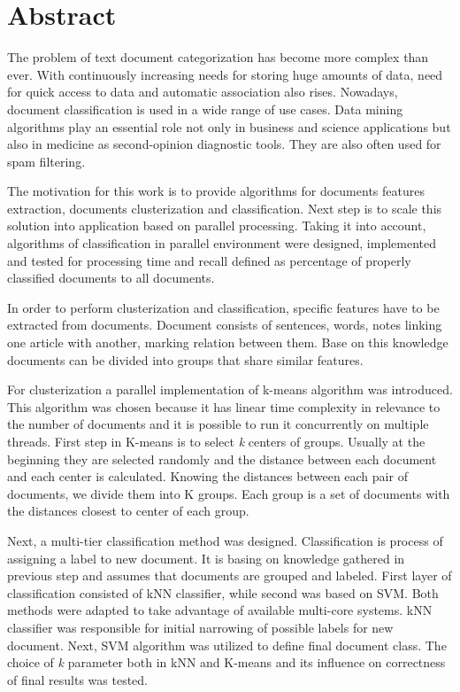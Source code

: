 \chapter*{Abstract}

The problem of text document categorization has become more complex than ever. With continuously increasing needs for storing huge amounts of data, need for quick access to data and automatic association also rises. Nowadays, document classification is used in a wide range of use cases. Data mining algorithms play an essential role not only in business and science applications but also in medicine as second-opinion diagnostic tools. They are also often used for spam filtering. 

The motivation for this work is to provide algorithms for documents features extraction, documents clusterization and classification. Next step is to scale this solution into application based on parallel processing. Taking it into account, algorithms of classification in parallel environment were designed, implemented and tested for processing time and recall defined as percentage of properly classified documents to all documents. 

In order to perform clusterization and classification, specific features have to be extracted from documents. Document consists of sentences, words, notes linking one article with another, marking relation between them. Base on this knowledge documents can be divided into groups that share similar features. 

For clusterization a parallel implementation of k-means algorithm was introduced. This algorithm was chosen because it has linear time complexity in relevance to the number of documents and it is possible to run it concurrently on multiple threads. First step in K-means is to select \textit{k} centers of groups. Usually at the beginning they are selected randomly and the distance between each document and each center is calculated.
Knowing the distances between each pair of documents, we divide them into K groups. Each group is a set of documents with the distances closest to center of each group. 

Next, a multi-tier classification method was designed. Classification is process of assigning a label to new document. It is basing on knowledge gathered in previous step and assumes that documents are grouped and labeled. First layer of classification consisted of kNN classifier, while second was based on SVM. Both methods were adapted to take advantage of available multi-core systems. kNN classifier was responsible for initial narrowing of possible labels for new document. Next, SVM algorithm was utilized to define final document class. The choice of \textit{k} parameter both in kNN and K-means and its influence on correctness of final results was tested. 

